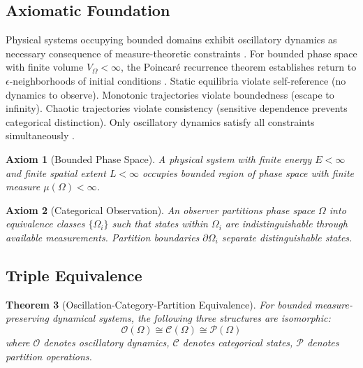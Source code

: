 \documentclass[11pt,a4paper]{article}
\newtheorem{theorem}{Theorem}[section]
\newtheorem{axiom}[theorem]{Axiom}
\theoremstyle{remark}
\begin{document}
\subsection{Axiomatic Foundation}

Physical systems occupying bounded domains exhibit oscillatory dynamics as necessary consequence of measure-theoretic constraints \citep{poincare1890probleme, birkhoff1931proof}. For bounded phase space with finite volume $V_\Omega < \infty$, the Poincar\'{e} recurrence theorem establishes return to $\epsilon$-neighborhoods of initial conditions \citep{poincare1890probleme}. Static equilibria violate self-reference (no dynamics to observe). Monotonic trajectories violate boundedness (escape to infinity). Chaotic trajectories violate consistency (sensitive dependence prevents categorical distinction). Only oscillatory dynamics satisfy all constraints simultaneously \citep{arnold1978mathematical}.

\begin{axiom}[Bounded Phase Space]
\label{ax:bounded_phase}
A physical system with finite energy $E < \infty$ and finite spatial extent $L < \infty$ occupies bounded region of phase space with finite measure $\mu(\Omega) < \infty$.
\end{axiom}

\begin{axiom}[Categorical Observation]
\label{ax:categorical_obs}
An observer partitions phase space $\Omega$ into equivalence classes $\{\Omega_i\}$ such that states within $\Omega_i$ are indistinguishable through available measurements. Partition boundaries $\partial\Omega_i$ separate distinguishable states.
\end{axiom}

\subsection{Triple Equivalence}

\begin{theorem}[Oscillation-Category-Partition Equivalence]
\label{thm:triple_equiv}
For bounded measure-preserving dynamical systems, the following three structures are isomorphic:
\begin{equation}
\mathcal{O}(\Omega) \cong \mathcal{C}(\Omega) \cong \mathcal{P}(\Omega)
\end{equation}
where $\mathcal{O}$ denotes oscillatory dynamics, $\mathcal{C}$ denotes categorical states, $\mathcal{P}$ denotes partition operations.
\end{theorem}
\end{document}
